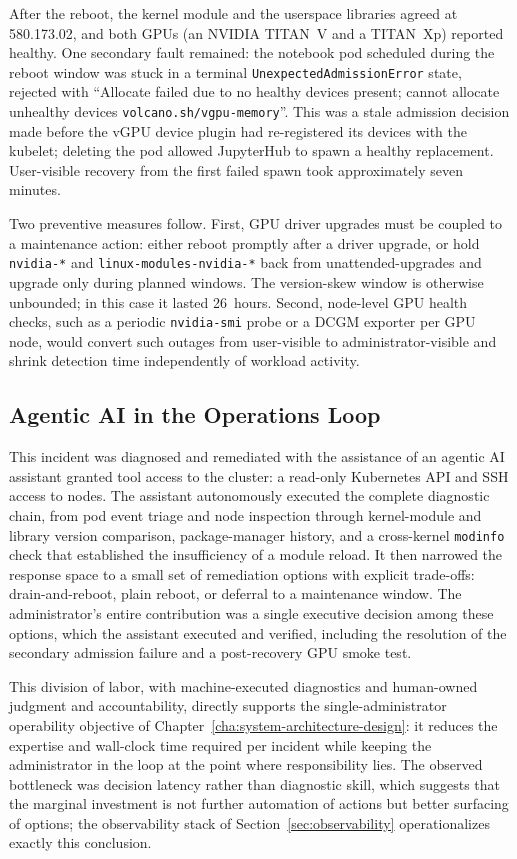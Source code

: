 After the reboot, the kernel module and the userspace libraries agreed at 580.173.02, and both GPUs (an NVIDIA TITAN~V and a TITAN~Xp) reported healthy. One secondary fault remained: the notebook pod scheduled during the reboot window was stuck in a terminal \texttt{UnexpectedAdmissionError} state, rejected with ``Allocate failed due to no healthy devices present; cannot allocate unhealthy devices \texttt{volcano.sh/vgpu-memory}''. This was a stale admission decision made before the vGPU device plugin had re-registered its devices with the kubelet; deleting the pod allowed JupyterHub to spawn a healthy replacement. User-visible recovery from the first failed spawn took approximately seven minutes.

Two preventive measures follow. First, GPU driver upgrades must be coupled to a maintenance action: either reboot promptly after a driver upgrade, or hold \texttt{nvidia-*} and \texttt{linux-modules-nvidia-*} back from unattended-upgrades and upgrade only during planned windows. The version-skew window is otherwise unbounded; in this case it lasted 26~hours. Second, node-level GPU health checks, such as a periodic \texttt{nvidia-smi} probe or a DCGM exporter per GPU node, would convert such outages from user-visible to administrator-visible and shrink detection time independently of workload activity.

\subsection{Agentic AI in the Operations Loop}
\label{sec:agentic-ops}

This incident was diagnosed and remediated with the assistance of an agentic AI assistant granted tool access to the cluster: a read-only Kubernetes API and SSH access to nodes. The assistant autonomously executed the complete diagnostic chain, from pod event triage and node inspection through kernel-module and library version comparison, package-manager history, and a cross-kernel \texttt{modinfo} check that established the insufficiency of a module reload. It then narrowed the response space to a small set of remediation options with explicit trade-offs: drain-and-reboot, plain reboot, or deferral to a maintenance window. The administrator's entire contribution was a single executive decision among these options, which the assistant executed and verified, including the resolution of the secondary admission failure and a post-recovery GPU smoke test.

This division of labor, with machine-executed diagnostics and human-owned judgment and accountability, directly supports the single-administrator operability objective of Chapter~\ref{cha:system-architecture-design}: it reduces the expertise and wall-clock time required per incident while keeping the administrator in the loop at the point where responsibility lies. The observed bottleneck was decision latency rather than diagnostic skill, which suggests that the marginal investment is not further automation of actions but better surfacing of options; the observability stack of Section~\ref{sec:observability} operationalizes exactly this conclusion.

